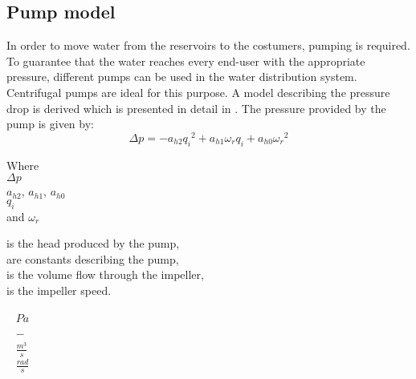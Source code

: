 \subsection{Pump model} 
\label{PumpModel}
In order to move water from the reservoirs to the costumers, pumping is required. To guarantee that the water reaches every end-user with the appropriate pressure, different pumps can be used in the water distribution system.\\
Centrifugal pumps are ideal for this purpose. 
A model describing the pressure drop is derived which is presented in detail in \cite{Phd_Carsten}. The pressure provided by the pump is given by:
\begin{equation}
  \Delta p = -a_{h2}{q_i}^2 + a_{h1} \omega_r q_i + a_{h0}{\omega_r}^2
  \label{PumpModel}
\end{equation}

\begin{minipage}[t]{0.20\textwidth}
Where\\
\hspace*{8mm} $\Delta p$ \\
\hspace*{8mm} $a_{h2}$, $a_{h1}$, $a_{h0}$ \\
\hspace*{8mm} $q_i$ \\
and \hspace*{0.7mm} $\omega_r$ 

\end{minipage}
\begin{minipage}[t]{0.68\textwidth}
\vspace*{2mm}
is the head produced by the pump,\\
are constants describing the pump,\\
is the volume flow through the impeller,\\
is the impeller speed.
\end{minipage}
\begin{minipage}[t]{0.10\textwidth}
\vspace*{2mm}
\textcolor{White}{te}$\unit{Pa}$\\
\textcolor{White}{te}$\unit{-}$\\
\textcolor{White}{te}$\unit{\frac{m^3}{s}}$\\
\textcolor{White}{te}$\unit{\frac{rad}{s}}$
\end{minipage}	

